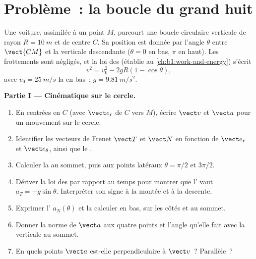 \section{Problème~: la boucle du grand huit}

\begin{problem}
\label{pb:b1:point-kinematics:1}
Une voiture, assimilée à un point $M$, parcourt une boucle circulaire
verticale de rayon $R = \qty{10}{m}$ et de centre $C$. Sa position est
donnée par l'angle $\theta$ entre $\vect{CM}$ et la verticale
descendante ($\theta =
0$ en bas, $\pi$ en haut). Les frottements sont négligés, et la loi des
 (établie au \cref{ch:b1:work-and-energy}) s'écrit
\[
v^2 = v_0^2 - 2gR(1 - \cos\theta),
\]
avec $v_0 = \qty{25}{m/s}$ la  en bas~; $g = \qty{9.81}{m/s^2}$.

\medskip
\noindent\textbf{Partie I --- Cinématique sur le cercle.}
\begin{enumerate}
  \item En  centrées en $C$ (avec $\vect e_r$ de $C$
        vers $M$), écrire $\vect v$ et $\vect a$ pour un mouvement sur le
        cercle.
  \item Identifier les vecteurs de Frenet $\vect T$ et $\vect N$ en
        fonction de $\vect e_r$ et $\vect e_\theta$, ainsi que le .
  \item Calculer la  au sommet, puis aux points latéraux
        $\theta = \pi/2$ et $3\pi/2$.
  \item Dériver la loi des  par rapport au temps pour montrer
        que l' vaut $a_T = -g\sin\theta$.
        Interpréter son signe à la montée et à la descente.
  \item Exprimer l' $a_N(\theta)$ et la calculer en
        bas, sur les côtés et au sommet.
  \item Donner la norme de $\vect a$ aux quatre points et l'angle
        qu'elle fait avec la verticale au sommet.
  \item En quels points $\vect a$ est-elle perpendiculaire à $\vect v$~?
        Parallèle~?
\end{enumerate}


\end{problem}
